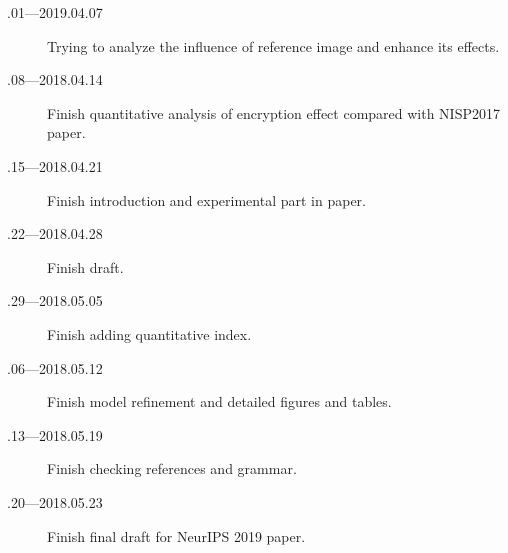 \documentclass[a4paper]{article}
\begin{document}
	\begin{description}
		\item[.01---2019.04.07] Trying to analyze the influence of reference image and enhance its effects.
		\item[.08---2018.04.14] Finish quantitative analysis of encryption effect compared with NISP2017 paper.
		\item[.15---2018.04.21] Finish introduction and experimental part in paper.
		\item[.22---2018.04.28] Finish draft.
		\item[.29---2018.05.05] Finish adding quantitative index.
		\item[.06---2018.05.12] Finish model refinement and detailed figures and tables.
		\item[.13---2018.05.19] Finish checking references and grammar.
		\item[.20---2018.05.23] Finish final draft for NeurIPS 2019 paper.
	\end{description}
	
	
	
	
\end{document}
